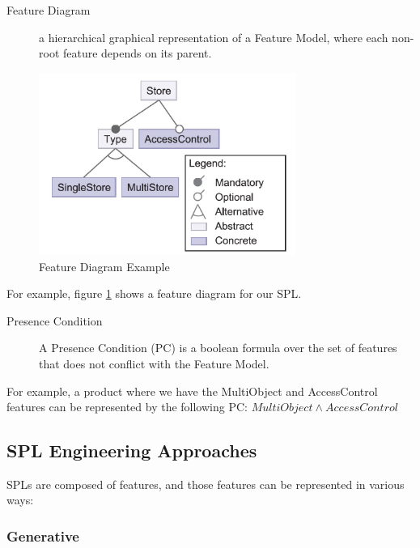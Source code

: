\documentclass[11pt]{article}
\begin{document}
\begin{description}

\item[Feature Diagram]
a hierarchical graphical representation of a Feature Model, where each non-root feature depends on its parent.

\end{description}

\begin{figure}
  \centering
    \includegraphics[width=0.75\textwidth]{FeatureDiagram}
  \caption{Feature Diagram Example}
  \label{fig:FeatureDiagram}
\end{figure}

For example, figure \ref{fig:FeatureDiagram} shows a feature diagram for our SPL.

\begin{description}

\item[Presence Condition]
A Presence Condition (PC) is a boolean formula over the set of features that does not conflict with the Feature Model.
\end{description}

For example, a product where we have the MultiObject and AccessControl features can be represented by the following PC: $ MultiObject \wedge AccessControl $

\subsection{SPL Engineering Approaches}

SPLs are composed of features, and those features can be represented in various ways:

\subsubsection{Generative}
\end{document}
